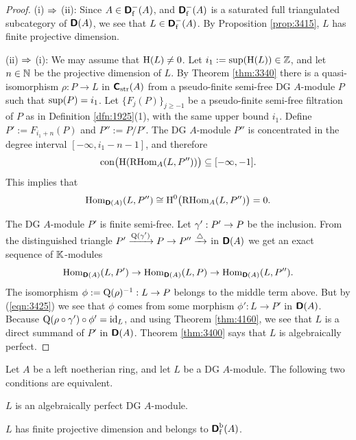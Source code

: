 \begin{proof} \mbox{}

\nopagebreak
\smallskip \noindent
(i) $\Rightarrow$ (ii): Since $A \in \boldsymbol{\mathsf{D}}^{-}_{\mathrm{f}}(A)$, and 
$\boldsymbol{\mathsf{D}}^{-}_{\mathrm{f}}(A)$ is a saturated full triangulated subcategory of 
$\boldsymbol{\mathsf{D}}(A)$, we see that $L \in \boldsymbol{\mathsf{D}}^{-}_{\mathrm{f}}(A)$. By Proposition 
\ref{prop:3415}, $L$ has finite projective dimension. 

\medskip \noindent
(ii) $\Rightarrow$ (i): We may assume that $\operatorname{H}(L) \neq 0$. 
Let $i_1 := \operatorname{sup}(\operatorname{H}(L)) \in \mathbb{Z}$, and let $n \in \mathbb{N}$ be the 
projective dimension of $L$.  By Theorem \ref{thm:3340}
there is a quasi-isomorphism $\rho : P \to L$ in $\boldsymbol{\mathsf{C}}_{\mathrm{str}}(A)$ from 
a pseudo-finite semi-free DG $A$-module $P$ such that 
$\operatorname{sup}(P) = i_1$. Let $\{ F_j(P) \}_{j \geq -1}$ be a pseudo-finite 
semi-free filtration of $P$ as in Definition \ref{dfn:1925}(1),
with the same upper bound $i_1$.
Define $P' := F_{i_1 + n}(P)$ and $P'' := P / P'$. 
The DG $A$-module $P''$ is concentrated in the degree interval 
$[-\infty, i_1 -n - 1]$, and therefore 
\[ \operatorname{con} \bigl( \operatorname{H} ( \operatorname{RHom}_A(L, P'')) \bigr) \subseteq
[-\infty, - 1] . \]
This implies that 
\begin{equation} \label{eqn:3425}
 \operatorname{Hom}_{\boldsymbol{\mathsf{D}}(A)}(L, P'') \cong 
\operatorname{H}^0 \bigl( \operatorname{RHom}_A(L, P'') \bigr) = 0 .
\end{equation}

The DG $A$-module $P'$ is finite semi-free. 
Let $\gamma' : P' \to P$ be the inclusion. 
From the distinguished triangle 
$P' \xrightarrow{\operatorname{Q}(\gamma')} P \to P'' \xrightarrow{\triangle}$
in $\boldsymbol{\mathsf{D}}(A)$ we get an exact sequence of $\mathbb{K}$-modules
\[ \operatorname{Hom}_{\boldsymbol{\mathsf{D}}(A)}(L, P') \to 
\operatorname{Hom}_{\boldsymbol{\mathsf{D}}(A)}(L, P) \to 
\operatorname{Hom}_{\boldsymbol{\mathsf{D}}(A)}(L, P'') . \]
The isomorphism 
$\phi := \operatorname{Q}(\rho)^{-1} : L \to P$
belongs to the middle term above. But by (\ref{eqn:3425}) we see that $\phi$ 
comes from some morphism 
$\phi' : L \to P'$ in $\boldsymbol{\mathsf{D}}(A)$. 
Because $\operatorname{Q}(\rho \circ \gamma') \circ \phi' = \operatorname{id}_L$, and using 
Theorem \ref{thm:4160},
we see that $L$ is a direct summand of $P'$ in $\boldsymbol{\mathsf{D}}(A)$. 
Theorem \ref{thm:3400} says that $L$ is algebraically perfect. 
\end{proof}

\begin{cor} \label{cor:3425}
Let $A$ be a left noetherian ring, and let $L$ be a DG $A$-module. The 
following 
two conditions are equivalent.
\begin{itemize}
  $L$ is an algebraically perfect DG $A$-module. 

 $L$ has finite projective dimension and belongs to 
$\boldsymbol{\mathsf{D}}^{\mathrm{b}}_{\mathrm{f}}(A)$.
\end{itemize}
\end{cor}

